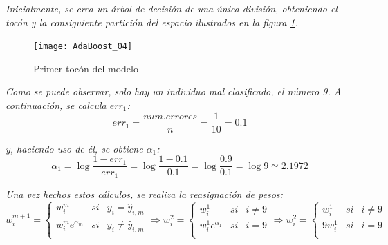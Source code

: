 \documentclass[12pt,twoside]{article}
\begin{document}
\textit{Inicialmente, se crea un árbol de decisión de una única división, obteniendo el tocón y la consiguiente partición del espacio ilustrados en la figura \ref{fig:AdaBoost_04}.}

\begin{figure}[h]
\centering
\texttt{[image: AdaBoost\_04]}
\caption{Primer tocón del modelo}
\label{fig:AdaBoost_04}
\end{figure}

\textit{Como se puede observar, solo hay un individuo mal clasificado, el número 9. A continuación, se calcula $err_1$:}
\begin{equation*}
err_1 = \frac{num.errores}{n} = \frac{1}{10} = 0.1
\end{equation*}

\noindent
\textit{y, haciendo uso de él, se obtiene $\alpha_1$:}
\begin{equation*}
\alpha_1 = \log{\frac{1 - err_1}{err_1}} = \log{\frac{1- 0.1}{0.1}} = \log{\frac{0.9}{0.1}} = \log{9} \simeq 2.1972
\end{equation*}

\textit{Una vez hechos estos cálculos, se realiza la reasignación de pesos:}
\begin{equation*}
w_i^{m+1} =
\left\{
\begin{array}{crl}
w_i^m & si & y_i = \hat{y}_{i, m} \\
w_i^m e^{\alpha_m} & si & y_i \neq \hat{y}_{i, m} \\
\end{array}
\right.
\Rightarrow
w_i^{2} =
\left\{
\begin{array}{crl}
w_i^1 & si & i \neq 9 \\
w_i^1 e^{\alpha_1} & si & i = 9 \\
\end{array}
\right.
\Rightarrow
w_i^{2} =
\left\{
\begin{array}{crl}
w_i^1 & si & i \neq 9 \\
9 w_i^1  & si & i = 9 \\
\end{array}
\right.
\end{equation*}
\end{document}
